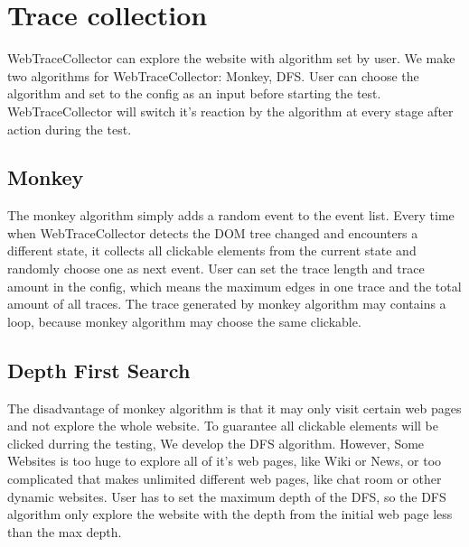 
\clearpage

\section{Trace collection}

WebTraceCollector can explore the website with algorithm set by user.
We make two algorithms for WebTraceCollector: Monkey, DFS.
User can choose the algorithm and set to the config as an input before starting the test.
WebTraceCollector will switch it's reaction by the algorithm at every stage after action during the test.


\subsection{Monkey}

The monkey algorithm simply adds a random event to the event list.
Every time when WebTraceCollector detects the DOM tree changed and encounters a different state,
it collects all clickable elements from the current state and randomly choose one as next event.
User can set the trace length and trace amount in the config,
which means the maximum edges in one trace and the total amount of all traces.
The trace generated by monkey algorithm may contains a loop, 
because monkey algorithm may choose the same clickable.


\subsection{Depth First Search}

The disadvantage of monkey algorithm is that it may only visit certain web pages and not explore the whole website.
To guarantee all clickable elements will be clicked durring the testing,
We develop the DFS algorithm.
However, Some Websites is too huge to explore all of it's web pages, like Wiki or News,
or too complicated that makes unlimited different web pages, like chat room or other dynamic websites. 
User has to set the maximum depth of the DFS,
so the DFS algorithm only explore the website with the depth from the initial web page less than the max depth.

